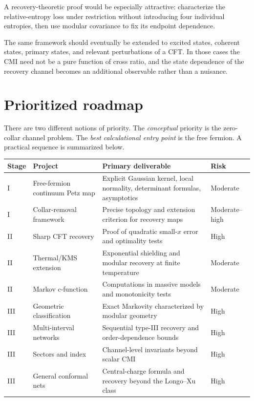 \documentclass[11pt]{article}
\theoremstyle{accenttheorem}
\theoremstyle{definition}
\newcommand{\1}{\mathbf{1}}
\begin{document}
A recovery-theoretic proof would be especially attractive: characterize the relative-entropy loss under restriction without introducing four individual entropies, then use modular covariance to fix its endpoint dependence.

The same framework should eventually be extended to excited states, coherent states, primary states, and relevant perturbations of a CFT.  In those cases the CMI need not be a pure function of cross ratio, and the state dependence of the recovery channel becomes an additional observable rather than a nuisance.

\section{Prioritized roadmap}

There are two different notions of priority.  The \emph{conceptual} priority is the zero-collar channel problem.  The \emph{best calculational entry point} is the free fermion.  A practical sequence is summarized below.

\begin{center}
\renewcommand{\arraystretch}{1.28}
\begin{tabularx}{0.96\textwidth}{>{\raggedright\arraybackslash}p{} >{\raggedright\arraybackslash}p{} X >{\raggedright\arraybackslash}p{}}
\toprule
\textbf{Stage} & \textbf{Project} & \textbf{Primary deliverable} & \textbf{Risk} \\
\midrule
I & Free-fermion continuum Petz map & Explicit Gaussian kernel, local normality, determinant formulas, asymptotics & Moderate \\
I & Collar-removal framework & Precise topology and extension criterion for recovery maps & Moderate--high \\
II & Sharp CFT recovery & Proof of quadratic small-\(x\) error and optimality tests & High \\
II & Thermal/KMS extension & Exponential shielding and modular recovery at finite temperature & Moderate \\
II & Markov c-function & Computations in massive models and monotonicity tests & Moderate \\
III & Geometric classification & Exact Markovity characterized by modular geometry & High \\
III & Multi-interval networks & Sequential type-III recovery and order-dependence bounds & High \\
III & Sectors and index & Channel-level invariants beyond scalar CMI & High \\
III & General conformal nets & Central-charge formula and recovery beyond the Longo--Xu class & High \\
\bottomrule
\end{tabularx}
\end{center}
\end{document}
